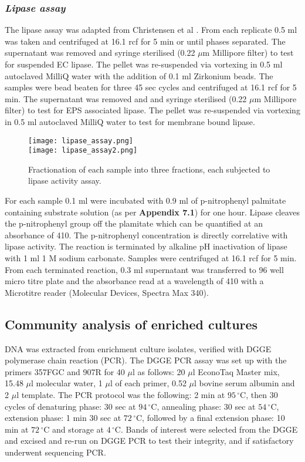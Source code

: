 \documentclass[twoside]{article}
\begin{document}
\subsubsection{\emph{Lipase assay}}
The lipase assay was adapted from Christensen et al \cite{christensen_03}. From each replicate 0.5 ml was taken and centrifuged at 16.1 rcf for 5 min or until phases separated. The supernatant was removed and syringe sterilised (0.22 $\mu$m Millipore filter) to test for suspended EC lipase.
The pellet was re-suspended via vortexing in 0.5 ml autoclaved MilliQ water with the addition of 0.1 ml Zirkonium beads. The samples were bead beaten for three 45 sec cycles and centrifuged at 16.1 rcf for 5 min. The supernatant was removed and and syringe sterilised (0.22 $\mu$m Millipore filter) to test for EPS associated lipase.
The pellet was re-suspended via vortexing in 0.5 ml autoclaved MilliQ water to test for membrane bound lipase.\\


\begin{figure}
\begin{center}
\texttt{[image: lipase\_assay.png]}\\
\texttt{[image: lipase\_assay2.png]}
\caption{Fractionation of each sample into three fractions, each subjected to lipase activity assay.}
\end{center}
\end{figure}

For each sample 0.1 ml were incubated with 0.9 ml of  p-nitrophenyl palmitate containing substrate solution (as per \textbf{Appendix 7.1}) for one hour. Lipase cleaves the p-nitrophenyl group off the plamitate which can be quantified at an absorbance of 410. The p-nitrophenyl concentration is directly correlative with lipase activity. The reaction is terminated by alkaline pH inactivation of lipase with 1 ml 1 M sodium carbonate. Samples were centrifuged at 16.1 rcf for 5 min. From each terminated reaction, 0.3 ml supernatant was transferred to 96 well micro titre plate and the absorbance read at a wavelength of 410 with a Microtitre reader (Molecular Devices, Spectra Max 340).
\FloatBarrier
\subsection{Community analysis of enriched cultures}
DNA was extracted from enrichment culture isolates, verified with DGGE polymerase chain reaction (PCR). The DGGE PCR assay was set up with the primers 357FGC and 907R for 40 $\mu$l as follows: 20 $\mu$l EconoTaq Master mix, 15.48 $\mu$l molecular water, 1 $\mu$l of each primer, 0.52 $\mu$l bovine serum albumin and 2 $\mu$l template. The PCR protocol was the following: 2 min at $95\,^{\circ}\mathrm{C}$, then 30 cycles of denaturing phase: 30 sec at $94\,^{\circ}\mathrm{C}$, annealing phase: 30 sec at  $54\,^{\circ}\mathrm{C}$, extension phase: 1 min 30 sec at $72\,^{\circ}\mathrm{C}$, followed by a final extension phase: 10 min at $72\,^{\circ}\mathrm{C}$ and storage at $4\,^{\circ}\mathrm{C}$.
Bands of interest were selected from the DGGE and excised and re-run on DGGE PCR to test their integrity, and if satisfactory underwent sequencing PCR. 
\end{document}
